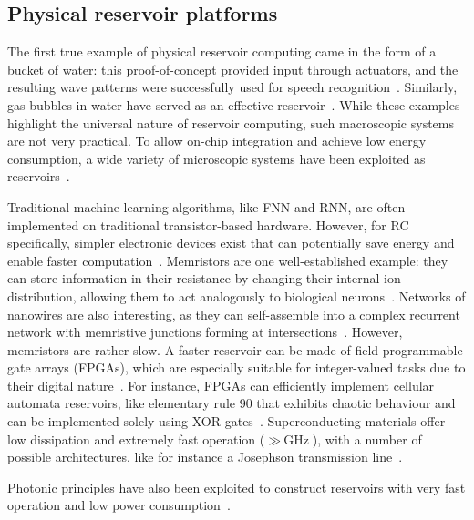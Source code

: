 \subsection{Physical reservoir platforms}\label{sec:1:PhysicalRCplatforms}
The first true example of physical reservoir computing came in the form of a bucket of water: this proof-of-concept provided input through actuators, and the resulting wave patterns were successfully used for speech recognition~\cite{PatternRecognition_Bucket}.
Similarly, gas bubbles in water have served as an effective reservoir~\cite{RC_GasBubbles}.
While these examples highlight the universal nature of reservoir computing, such macroscopic systems are not very practical.
To allow on-chip integration and achieve low energy consumption, a wide variety of microscopic systems have been exploited as reservoirs~\cite{RC_RecentAdvances}. \par
Traditional machine learning algorithms, like FNN and RNN, are often implemented on traditional transistor-based hardware.
However, for RC specifically, simpler electronic devices exist that can potentially save energy and enable faster computation~\cite{RC_RecentAdvances}.
Memristors are one well-established example: they can store information in their resistance by changing their internal ion distribution, allowing them to act analogously to biological neurons~\cite{MemristorArtificialNeuron,MemristiveNN,RC_DiffusiveMemristors,RC_MemristorTemporal}.
Networks of nanowires are also interesting, as they can self-assemble into a complex recurrent network with memristive junctions forming at intersections~\cite{RC_NNN}.
However, memristors are rather slow.
A faster reservoir can be made of field-programmable gate arrays (FPGAs), which are especially suitable for integer-valued tasks due to their digital nature~\cite{RC_RapidTimeSeries,BookReservoirComputing}. %
For instance, FPGAs can efficiently implement cellular automata reservoirs, like elementary rule 90 that exhibits chaotic behaviour and can be implemented solely using XOR gates~\cite{RC_CA}.
Superconducting materials offer low dissipation and extremely fast operation ($\gg \SI{}{\giga\hertz}$), with a number of possible architectures, like for instance a Josephson transmission line~\cite{RC_SuperconductingElectronics}. \par %
Photonic principles have also been exploited to construct reservoirs with very fast operation and low power consumption~\cite{RC_RecentAdvances}.
